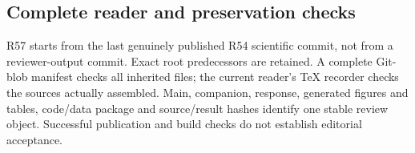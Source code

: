 \subsection{Complete reader and preservation checks}
R57 starts from the last genuinely published R54 scientific commit, not from a reviewer-output commit. Exact root predecessors are retained. A complete Git-blob manifest checks all inherited files; the current reader's TeX recorder checks the sources actually assembled. Main, companion, response, generated figures and tables, code/data package and source/result hashes identify one stable review object. Successful publication and build checks do not establish editorial acceptance.
